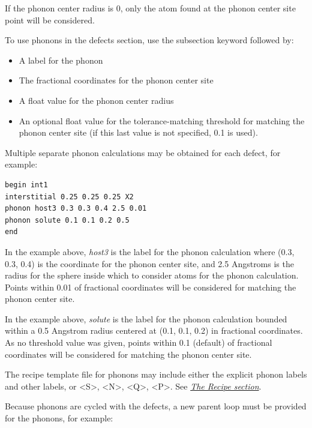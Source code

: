 \documentclass[letterpaper,10pt,english]{sphinxmanual}
\begin{document}
If the phonon center radius is 0, only the atom found at the phonon center site point will be considered.

To use phonons in the defects section, use the subsection keyword  followed by:
\begin{itemize}
\item {} 
A label for the phonon

\item {} 
The fractional coordinates for the phonon center site

\item {} 
A float value for the phonon center radius

\item {} 
An optional float value for the tolerance-matching threshold for matching the phonon center site (if this last value is not specified, 0.1 is used).

\end{itemize}

Multiple separate phonon calculations may be obtained for each defect, for example:

\begin{Verbatim}[commandchars=\\\{\}]
begin int1
interstitial 0.25 0.25 0.25 X2
phonon host3 0.3 0.3 0.4 2.5 0.01
phonon solute 0.1 0.1 0.2 0.5
end
\end{Verbatim}

In the example above, \emph{host3} is the label for the phonon calculation where (0.3, 0.3, 0.4) is the coordinate for the phonon center site, and 2.5 Angstroms is the radius for the sphere inside which to consider atoms for the phonon calculation. Points within 0.01 of fractional coordinates will be considered for matching the phonon center site.

In the example above, \emph{solute} is the label for the phonon calculation bounded within a 0.5 Angstrom radius centered at (0.1, 0.1, 0.2) in fractional coordinates. As no threshold value was given, points within 0.1 (default) of fractional coordinates will be considered for matching the phonon center site.

The recipe template file for phonons may include either the explicit phonon labels and other labels, or \textless{}S\textgreater{}, \textless{}N\textgreater{}, \textless{}Q\textgreater{}, \textless{}P\textgreater{}. See {\hyperref[3_1_3_recipe::doc]{\emph{The Recipe section}}}.

Because phonons are cycled with the defects, a new parent loop must be provided for the phonons, for example:
\end{document}
